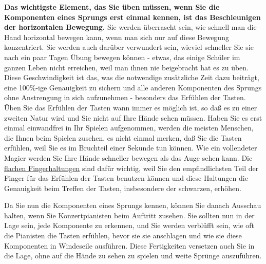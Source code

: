\textbf{Das wichtigste Element, das Sie üben müssen, wenn Sie die Komponenten eines Sprungs erst einmal kennen, ist das Beschleunigen der horizontalen Bewegung.}
Sie werden überrascht sein, wie schnell man die Hand horizontal bewegen kann, wenn man sich nur auf diese Bewegung konzentriert.
Sie werden auch darüber verwundert sein, wieviel schneller Sie sie nach ein paar Tagen Übung bewegen können - etwas, das einige Schüler im ganzen Leben nicht erreichen, weil man ihnen nie beigebracht hat es zu üben.
Diese Geschwindigkeit ist das, was die notwendige zusätzliche Zeit dazu beiträgt, eine 100\%-ige Genauigkeit zu sichern und alle anderen Komponenten des Sprungs ohne Anstrengung in sich aufzunehmen - besonders das Erfühlen der Tasten.
Üben Sie das Erfühlen der Tasten wann immer es möglich ist, so daß es zu einer zweiten Natur wird und Sie nicht auf Ihre Hände sehen müssen.
Haben Sie es erst einmal einwandfrei in Ihr Spielen aufgenommen, werden die meisten Menschen, die Ihnen beim Spielen zusehen, es nicht einmal merken, daß Sie die Tasten erfühlen, weil Sie es im Bruchteil einer Sekunde tun können.
Wie ein vollendeter Magier werden Sie Ihre Hände schneller bewegen als das Auge sehen kann.
Die \hyperref[c1iii4b]{flachen Fingerhaltungen} sind dafür wichtig, weil Sie den empfindlichsten Teil der Finger für das Erfühlen der Tasten benutzen können und diese Haltungen die Genauigkeit beim Treffen der Tasten, insbesondere der schwarzen, erhöhen.

Da Sie nun die Komponenten eines Sprungs kennen, können Sie danach Ausschau halten, wenn Sie Konzertpianisten beim Auftritt zusehen.
Sie sollten nun in der Lage sein, jede Komponente zu erkennen, und Sie werden verblüfft sein, wie oft die Pianisten die Tasten erfühlen, bevor sie sie anschlagen und wie sie diese Komponenten in Windeseile ausführen.
Diese Fertigkeiten versetzen auch Sie in die Lage, ohne auf die Hände zu sehen zu spielen und weite Sprünge auszuführen.

